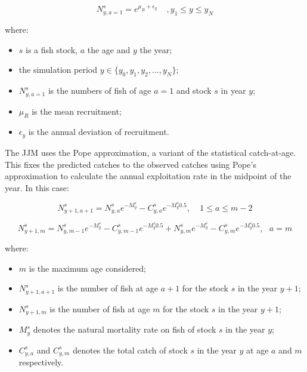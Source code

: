 \documentclass{article}
\begin{document}
\begin{equation}
N^s_{y,a=1}=e^{\mu_R+\epsilon_{y}}  \ \ \ \ \ , y_{1}\leq y \leq y_{N}
\end{equation}

where:
\begin{itemize}
    \item $s$ is a fish stock, $a$ the age and $y$ the year;
    
    \item the simulation period ${y \in \{y_{0}, y_1, y_2,..., y_{N}\}}$;   
  
    \item $N^s_{y,a=1}$ is the numbers of fish of age $a=1$ and stock $s$ in year $y$;
    
    \item $\mu_R$ is the mean recruitment;

    \item $\epsilon_{y}$ is the annual deviation of recruitment.
    
\end{itemize}

The JJM uses the Pope approximation, a variant of the statistical catch-at-age. This fixes the predicted catches to the observed catches using Pope's approximation to calculate the annual exploitation rate in the midpoint of the year. In this case:

\begin{equation}
N^{s}_{y+1,a+1}=N^s_{y,a}e^{-M^s_y}-C^s_{y,a}e^{-M^s_y 0.5}, \ \ \ \ \ 1\leq a \leq m-2
\end{equation}
    
\begin{equation}
N^s_{y+1,m}=N^s_{y,m-1}e^{-M^s_y}-C^s_{y,m-1}e^{-M^s_y 0.5}+N^s_{y,m}e^{-M^s_y}-C^s_{y,m}e^{-M^s_y 0.5}, \ \ \ a = m
\end{equation}

where:
\begin{itemize}
    \item $m$ is the maximum age considered;
    
    \item $N^{s}_{y+1,a+1}$ is the number of fish at age $a+1$ for the stock $s$ in the year $y+1$;

    \item $N^{s}_{y+1,m}$ is the number of fish at age $m$ for the stock $s$ in the year $y+1$;

    \item $M^{s}_{y}$ denotes the natural mortality rate on fish of stock $s$ in the year $y$;

    \item $C^s_{y,a}$ and $C^s_{y,m}$ denotes the total catch of stock $s$ in the year $y$ at age $a$ and $m$ respectively.
    
\end{itemize}
\end{document}

